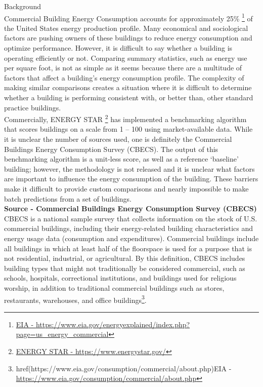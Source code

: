 {\Large {Background}}
\\
Commercial Building Energy Consumption accounts for approximately 25\% \footnote{\href{https://www.eia.gov/energyexplained/index.php?page=us_energy_commercial}{EIA - \url{https://www.eia.gov/energyexplained/index.php?page=us_energy_commercial}}} of the United States energy production profile.  Many economical and sociological factors are pushing owners of these buildings to reduce energy consumption and optimize performance.  However, it is difficult to say whether a building is operating efficiently or not.  Comparing summary statistics, such as energy use per square foot, is not as simple as it seems because there are a multitude of factors that affect a building’s energy consumption profile.  The complexity of making similar comparisons creates a situation where it is difficult to determine whether a building is performing consistent with, or better than, other standard practice buildings. 
\\
Commercially, ENERGY STAR \footnote{\href{https://www.energystar.gov/}{ENERGY STAR - \url{https://www.energystar.gov/}}} has implemented a benchmarking algorithm that scores buildings on a scale from 1 – 100 using market-available data.  While it is unclear the number of sources used, one is definitely the Commercial Buildings Energy Consumption Survey (CBECS).  The output of this benchmarking algorithm is a unit-less score, as well as a reference ‘baseline’ building; however, the methodology is not released and it is unclear what factors are important to influence the energy consumption of the building.  These barriers make it difficult to provide custom comparisons and nearly impossible to make batch predictions from a set of buildings.
\\[0.125in]
\textbf{Source - Commercial Buildings Energy Consumption Survey (CBECS)}
\\[0.0625in]
CBECS is a national sample survey that collects information on the stock of U.S. commercial buildings, including their energy-related building characteristics and energy usage data (consumption and expenditures). Commercial buildings include all buildings in which at least half of the floorspace is used for a purpose that is not residential, industrial, or agricultural. By this definition, CBECS includes building types that might not traditionally be considered commercial, such as schools, hospitals, correctional institutions, and buildings used for religious worship, in addition to traditional commercial buildings such as stores, restaurants, warehouses, and office buildings\footnote{href{(https://www.eia.gov/consumption/commercial/about.php)}{EIA - \url{https://www.eia.gov/consumption/commercial/about.php}}}.